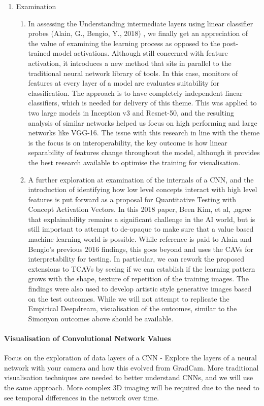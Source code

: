 \begin{enumerate}
    \item Examination
    \begin{enumerate}
        \item In assessing the Understanding intermediate layers using linear classifier probes (Alain, G., Bengio, Y., 2018) , we finally get an appreciation of the value of examining the learning process as opposed to the post-trained model activations. Although still concerned with feature activation, it introduces a new method that sits in parallel to the traditional neural network library of tools. In this case, monitors of features at every layer of a model are evaluates suitability for classification. The approach is to have completely independent linear classifiers, which is needed for delivery of this theme. This was applied to two large models in Inception v3 and Resnet-50, and the resulting analysis of similar networks helped us focus on high performing and large networks like VGG-16. The issue with this research in line with the theme is the focus is on interoperability, the key outcome is how linear separability of features change throughout the model, although it provides the best research available to optimise the training for visualisation.
        \item A further exploration at examination of the internals of a CNN, and the introduction of identifying how low level concepts interact with high level features is put forward as a proposal for Quantitative Testing with Concept Activation Vectors. In this 2018 paper, Been Kim, et al, ,agree that explainability remains a significant challenge in the AI world, but is still important to attempt to de-opaque to make sure that a value based machine learning world is possible. While reference is paid to Alain and Bengio’s previous 2016 findings, this goes beyond and uses the CAVs for interpretability for testing. In particular, we can rework the proposed extensions to TCAVs by seeing if we can establish if the learning pattern grows with the shape, texture of repetition of the training images.  The findings were also used to develop artistic style generative images based on the test outcomes. While we will not attempt to replicate the Empirical Deepdream, visualisation of the outcomes, similar to the Simonyon outcomes above should be available.
    \end{enumerate}
\end{enumerate}

\paragraph{Visualisation of Convolutional Network Values}
Focus on the exploration of data layers of a CNN - Explore the layers of a neural network with your camera and how this evolved from GradCam. More traditional visualisation techniques are needed to better understand CNNs, and we will use the same approach. More complex 3D imaging will be required due to the need to see temporal differences in the network over time.

